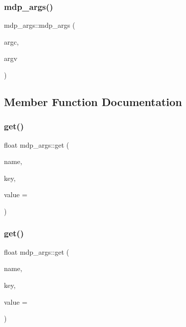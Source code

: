 \subsubsection{\texorpdfstring{mdp\+\_\+args()}{mdp\_args()}}
{\footnotesize\ttfamily mdp\+\_\+args\+::mdp\+\_\+args (\begin{DoxyParamCaption}\item[{int}]{argc,  }\item[{char $\ast$$\ast$}]{argv }\end{DoxyParamCaption})\hspace{0.3cm}{\ttfamily [inline]}}



\subsection{Member Function Documentation}
\mbox{\label{classmdp__args_a65b9fd580c173e59eb8b1bd85da9d7a4}} 
\subsubsection{\texorpdfstring{get()}{get()}\hspace{0.1cm}{\footnotesize\ttfamily [1/4]}}
{\footnotesize\ttfamily float mdp\+\_\+args\+::get (\begin{DoxyParamCaption}\item[{string}]{name,  }\item[{string}]{key,  }\item[{float}]{value = {} }\end{DoxyParamCaption})\hspace{0.3cm}{\ttfamily [inline]}}

\mbox{\label{classmdp__args_ab1b9234809ab22ba2f078ae72aa283ec}} 
\subsubsection{\texorpdfstring{get()}{get()}\hspace{0.1cm}{\footnotesize\ttfamily [2/4]}}
{\footnotesize\ttfamily float mdp\+\_\+args\+::get (\begin{DoxyParamCaption}\item[{string}]{name,  }\item[{string}]{key,  }\item[{double}]{value = {} }\end{DoxyParamCaption})\hspace{0.3cm}{\ttfamily [inline]}}

